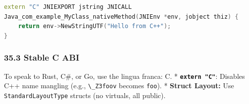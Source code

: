 \begin{lstlisting}[language={C++}]
extern "C" JNIEXPORT jstring JNICALL
Java_com_example_MyClass_nativeMethod(JNIEnv *env, jobject thiz) {
    return env->NewStringUTF("Hello from C++");
}
\end{lstlisting}

\hypertarget{stable-c-abi}{%
\subsubsection{35.3 Stable C ABI}\label{stable-c-abi}}

To speak to Rust, C\#, or Go, use the lingua franca: C. *
\textbf{\passthrough{\lstinline!extern "C"!}}: Disables C++ name
mangling (e.g., \passthrough{\lstinline!\_Z3foov!} becomes
\passthrough{\lstinline!foo!}). * \textbf{Struct Layout:} Use
\passthrough{\lstinline!StandardLayoutType!} structs (no virtuals, all
public).
